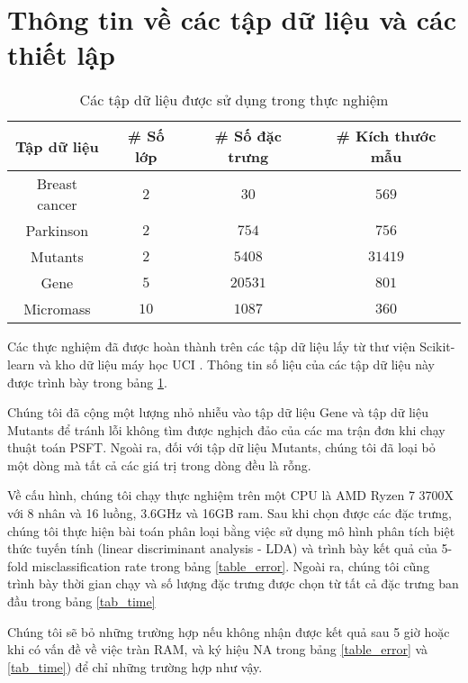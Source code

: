 \section{Thông tin về các tập dữ liệu và các thiết lập}
\begin{table}[htbp]
	\caption{Các tập dữ liệu được sử dụng trong thực nghiệm}
	\begin{center}
		\begin{tabular}{|c|c|c|c|}
			\hline
			Tập dữ liệu & \# Số lớp & \# Số đặc trưng & \# Kích thước mẫu \\
			\hline
			Breast cancer & $2$ & $30$ & $569$ \\
			\hline
			Parkinson & $2$ & $754$ & $756$ \\
			\hline
			Mutants & $2$  & $5408$ & $31419$\\
			\hline
			Gene & $5$ & $20531$ & $801$ \\
			\hline
			Micromass & $10$ & $1087$ & $360$\\
			\hline
		\end{tabular}
		\label{table_info_datasets}
	\end{center}
\end{table}
Các thực nghiệm đã được hoàn thành trên các tập dữ liệu lấy từ thư viện Scikit-learn \cite{scikit-learn} và kho dữ liệu máy học UCI \cite{Dua:2019}. Thông tin số liệu của các tập dữ liệu này được trình bày trong bảng \ref{table_info_datasets}.

Chúng tôi đã cộng một lượng nhỏ nhiễu vào tập dữ liệu Gene và tập dữ liệu Mutants để tránh lỗi không tìm được nghịch đảo của các ma trận đơn khi chạy thuật toán PSFT. Ngoài ra, đối với tập dữ liệu Mutants, chúng tôi đã loại bỏ một dòng mà tất cả các giá trị trong dòng đều là rỗng. 

Về cấu hình, chúng tôi chạy thực nghiệm trên một CPU là AMD Ryzen 7 3700X với 8 nhân và 16 luồng, 3.6GHz và 16GB ram. Sau khi chọn được các đặc trưng, chúng tôi thực hiện bài toán phân loại bằng việc sử dụng mô hình phân tích biệt thức tuyến tính (linear discriminant analysis - LDA) và trình bày kết quả của 5-fold misclassification rate trong bảng \ref{table_error}. Ngoài ra, chúng tôi cũng trình bày thời gian chạy và số lượng đặc trưng được chọn từ tất cả đặc trưng ban đầu trong bảng \ref{tab_time}

Chúng tôi sẽ bỏ những trường hợp nếu không nhận được kết quả sau 5 giờ hoặc khi có vấn đề về việc tràn RAM, và ký hiệu NA trong bảng \ref{table_error} và \ref{tab_time}) để chỉ những trường hợp như vậy.

